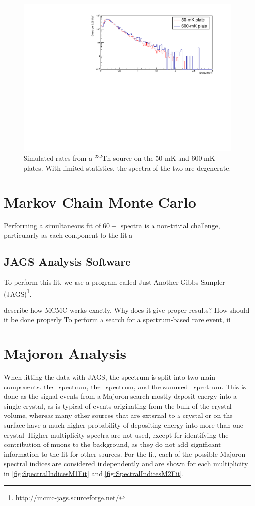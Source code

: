 \begin{figure}[htbp]
    \centering
    \includegraphics[width=0.8\linewidth]{Figures/th232_copper_plates.pdf}
    \caption[Simulated rates from a $^{232}$Th source on the 50-mK and 600-mK plates.]
    {Simulated rates from a $^{232}$Th source on the 50-mK and 600-mK plates.
    With limited statistics, the spectra of the two are degenerate.}
    \label{fig:degenerate_sources}
\end{figure}

\section{Markov Chain Monte Carlo}
\label{sec:MCMC}
Performing a simultaneous fit of $60+$ spectra is a non-trivial challenge, particularly as each component to the fit a
\subsection*{JAGS Analysis Software}
To perform this fit, we use a program called Just Another Gibbs Sampler (JAGS)\footnote{http://mcmc-jags.sourceforge.net/}.

describe how MCMC works exactly. Why does it give proper results? How should it be done properly
To perform a search for a spectrum-based rare event, it 

\section{Majoron Analysis}
When fitting the data with JAGS, the spectrum is split into two main components: the \Mone~spectrum, the \Mtwo~spectrum, and the summed \Msum~spectrum. This is done as the signal events from a Majoron search mostly deposit energy into a single crystal, as is typical of events originating from the bulk of the crystal volume, whereas many other sources that are external to a crystal or on the surface have a much higher probability of depositing energy into more than one crystal. Higher multiplicity spectra are not used, except for identifying the contribution of muons to the background, as they do not add significant information to the fit for other sources. For the fit, each of the possible Majoron spectral indices are considered independently and are shown for each multiplicity in \autoref{fig:SpectralIndicesM1Fit} and \autoref{fig:SpectralIndicesM2Fit}.


